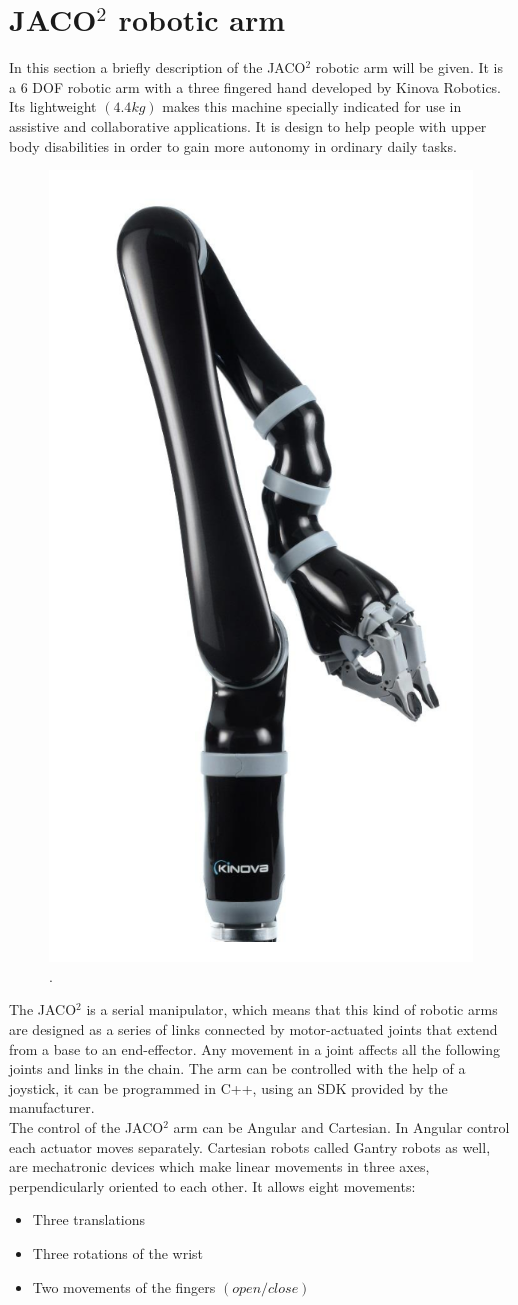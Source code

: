 \section{JACO$^2$ robotic arm}

In this section a briefly description of the JACO$^2$ robotic arm will be given. It is a 6 DOF robotic arm  with a three fingered hand developed by Kinova Robotics. Its lightweight $\left( 4.4 kg\right)$  makes this machine specially indicated for use in assistive and collaborative applications. It is design to help people with upper body disabilities in order to gain more autonomy in ordinary daily tasks.\\

\begin{figure}[H]                    
\includegraphics[width=.3\textwidth]{figures/Jaco/roboticarm}  %
\caption{. \cite{}}
\label{fig:roboticarm}  %
\end{figure}
The JACO$^2$  is a serial manipulator, which means that this kind of robotic arms are designed as a series of links connected by motor-actuated joints that extend from a base to an end-effector. Any movement in a joint affects all the following joints and links in the chain. The arm can be controlled with the help of a joystick, it can be programmed in C++, using an SDK provided by the manufacturer.\\


The control of the JACO$^2$ arm can be Angular and Cartesian. In Angular control each actuator moves separately. Cartesian robots called Gantry robots as well, are mechatronic devices which make linear movements in three axes, perpendicularly oriented to each other. It allows eight movements:
\begin{itemize}
\item Three translations
\item Three rotations of the wrist
\item Two movements of the fingers $\left( open/close\right) $
\end{itemize}

